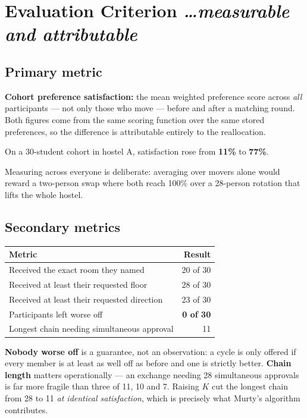 \documentclass[11pt,a4paper]{article}
\newcommand{\BvrHint}[1]{%
  {\normalfont\normalsize\itshape\hfill #1}}
\begin{document}
\section{Evaluation Criterion %
\BvrHint{\ldots measurable and attributable}}

\subsection{Primary metric}
\textbf{Cohort preference satisfaction:} the mean
weighted preference score across \emph{all} participants
--- not only those who move --- before and after a
matching round. Both figures come from the same scoring
function over the same stored preferences, so the
difference is attributable entirely to the reallocation.

On a 30-student cohort in hostel A, satisfaction rose
from \textbf{11\%} to \textbf{77\%}.

Measuring across everyone is deliberate: averaging over
movers alone would reward a two-person swap where both
reach 100\% over a 28-person rotation that lifts the
whole hostel.

\subsection{Secondary metrics}
\begin{table}[h]
\centering
\begin{tabular}{lr}
\toprule
\textbf{Metric} & \textbf{Result} \\
\midrule
Received the exact room they named & 20 of 30 \\
Received at least their requested floor & 28 of 30 \\
Received at least their requested direction & 23 of 30 \\
Participants left worse off & \textbf{0 of 30} \\
Longest chain needing simultaneous approval & 11 \\
\bottomrule
\end{tabular}
\end{table}

\textbf{Nobody worse off} is a guarantee, not an
observation: a cycle is only offered if every member is
at least as well off as before and one is strictly
better. \textbf{Chain length} matters operationally ---
an exchange needing 28 simultaneous approvals is far
more fragile than three of 11, 10 and 7. Raising $K$ cut
the longest chain from 28 to 11 \emph{at identical
satisfaction}, which is precisely what Murty's algorithm
contributes.
\end{document}
